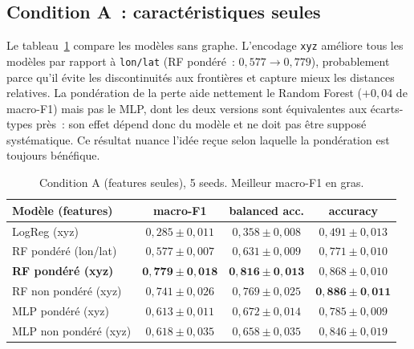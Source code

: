 \documentclass[french]{llncs}
\begin{document}
    \subsection{Condition A~: caractéristiques seules}

    Le tableau~\ref{tab:features} compare les modèles sans graphe. L'encodage \texttt{xyz}
    améliore tous les modèles par rapport à \texttt{lon/lat} (RF pondéré~: $0,577 \rightarrow 0,779$),
    probablement parce qu'il évite les discontinuités aux frontières et capture mieux les distances
    relatives. La pondération de la perte aide nettement le Random Forest ($+0,04$ de macro-F1)
    mais pas le MLP, dont les deux versions sont équivalentes aux écarts-types près~: son effet
    dépend donc du modèle et ne doit pas être supposé systématique. Ce résultat nuance l'idée reçue
    selon laquelle la pondération est toujours bénéfique.

    \begin{table}[ht]
     \begin{center}
       \scriptsize
       \setlength{\tabcolsep}{4pt}
       \renewcommand{\arraystretch}{0.8}
       \begin{tabular}{l c c c}
       \toprule
       Modèle (features) & macro-F1 & balanced acc. & accuracy \\
       \midrule
       LogReg (xyz)                       & $0,285 \pm 0,011$ & $0,358 \pm 0,008$ & $0,491 \pm 0,013$ \\
       RF pondéré (lon/lat)               & $0,577 \pm 0,007$ & $0,631 \pm 0,009$ & $0,771 \pm 0,010$ \\
       \textbf{RF pondéré (xyz)}          & $\mathbf{0,779 \pm 0,018}$ & $\mathbf{0,816 \pm 0,013}$ & $0,868 \pm 0,010$ \\
       RF non pondéré (xyz)               & $0,741 \pm 0,026$ & $0,769 \pm 0,025$ & $\mathbf{0,886 \pm 0,011}$ \\
       MLP pondéré (xyz)                  & $0,613 \pm 0,011$ & $0,672 \pm 0,014$ & $0,785 \pm 0,009$ \\
       MLP non pondéré (xyz)              & $0,618 \pm 0,035$ & $0,658 \pm 0,035$ & $0,846 \pm 0,019$ \\
       \bottomrule
       \end{tabular}
      \caption{Condition A (features seules), 5 seeds. Meilleur macro-F1 en gras.} \label{tab:features}
     \end{center}
    \end{table}
\end{document}
